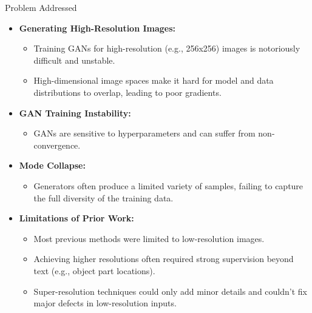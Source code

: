 \documentclass{beamer}
\begin{document}
\begin{frame}{Problem Addressed}
    \begin{itemize}
        \item \textbf{Generating High-Resolution Images:}
        \begin{itemize}
            \item Training GANs for high-resolution (e.g., 256x256) images is notoriously difficult and unstable.
            \item High-dimensional image spaces make it hard for model and data distributions to overlap, leading to poor gradients.
        \end{itemize}
        \item \textbf{GAN Training Instability:}
        \begin{itemize}
            \item GANs are sensitive to hyperparameters and can suffer from non-convergence.
        \end{itemize}
        \item \textbf{Mode Collapse:}
        \begin{itemize}
            \item Generators often produce a limited variety of samples, failing to capture the full diversity of the training data.
        \end{itemize}
        \item \textbf{Limitations of Prior Work:}
        \begin{itemize}
            \item Most previous methods were limited to low-resolution images.
            \item Achieving higher resolutions often required strong supervision beyond text (e.g., object part locations).
            \item Super-resolution techniques could only add minor details and couldn't fix major defects in low-resolution inputs.
        \end{itemize}
    \end{itemize}
\end{frame}
\end{document}
